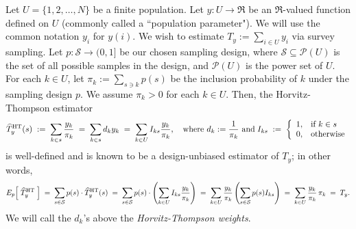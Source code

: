 \documentclass{article}
\begin{document}
Let $U = \{1,2,\ldots,N\}$ be a finite population.
Let $y : U \longrightarrow \Re$ be an $\Re$-valued function defined on $U$
(commonly called a ``population parameter").
We will use the common notation $y_{i}$ for $y(i)$.
We wish to estimate $T_{y} := \sum_{i \in U} y_{i}$ via survey sampling.
Let $p:\mathcal{S} \longrightarrow (0,1]$ be our chosen sampling design,
where $\mathcal{S} \subseteq \mathcal{P}(U)$ is the set of all possible
samples in the design, and $\mathcal{P}(U)$ is the power set of $U$.
For each $k \in U$, let $\pi_{k} := \sum_{s \ni k}p(s)$ be the inclusion probability
of $k$ under the sampling design $p$.
We assume $\pi_{k} > 0$ for each $k \in U$.
Then, the Horvitz-Thompson estimator
\begin{equation*}
\widehat{T}^{\textnormal{HT}}_{y}(s)
\;:=\;\sum_{k \in s} \dfrac{y_{k}}{\pi_{k}}
\; =\;\sum_{k \in s} d_{k}y_{k}
\; =\;\sum_{k \in U} I_{ks}\dfrac{y_{k}}{\pi_{k}},
\quad
\textnormal{where $d_{k} := \dfrac{1}{\pi_{k}}$ and}
\;
I_{ks} \; := \; \left\{\begin{array}{cl} 1, & \textnormal{if $k \in s$} \\ 0, &  \textnormal{otherwise} \end{array}\right. 
\end{equation*}
is well-defined and is known to be a design-unbiased estimator of $T_{y}$; in other words,
\begin{equation*}
E_{p}\!\left[\;\widehat{T}^{\textnormal{HT}}_{y}\;\right]
\; = \; \sum_{s \in \mathcal{S}} p(s)\cdot \widehat{T}^{\textnormal{HT}}_{y}(s)
\; = \; \sum_{s \in \mathcal{S}} p(s)\cdot\left(\sum_{k \in U} I_{ks}\dfrac{y_{k}}{\pi_{k}}\right)
\; = \; \sum_{k \in U} \dfrac{y_{k}}{\pi_{k}} \left(\sum_{s \in \mathcal{S}} p(s) I_{ks}\right)
\; = \; \sum_{k \in U} \dfrac{y_{k}}{\pi_{k}}\,\pi_{k}
\; = \; T_{y}.
\end{equation*}
We will call the $d_{k}$'s above the \textit{Horvitz-Thompson weights}.

\vskip 0.5cm
\end{document}
